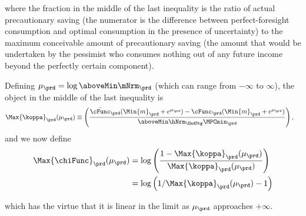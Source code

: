 \documentclass[titlepage, headings=optiontotocandhead]{econark}
\begin{document}
  \noindent  where the fraction in the middle of the last inequality is the ratio
  of actual precautionary saving (the numerator is the difference
  between perfect-foresight consumption and optimal consumption in the
  presence of uncertainty) to the maximum conceivable amount of
  precautionary saving (the amount that would be undertaken by the
  pessimist who consumes nothing out of any future income beyond the perfectly certain component).



  Defining $\mu_{\prd} =
  \log \aboveMin \mNrm_{\prd}$ (which can range from $-\infty$ to $\infty$), the object in the middle of the last inequality is
  \begin{equation}\begin{gathered}\begin{aligned}
        \Max{\koppa}_{\prd}(\mu_{\prd})   & \equiv  \left(\frac{\bar{\cFunc}_{\prd}(\Min{m}_{\prd}+e^{\mu_{\prd}})-\cFunc_{\prd}(\Min{m}_{\prd}+e^{\mu_{\prd}})}{\aboveMin \hNrm_{\EndStg} \MPCmin_{\prd}}\right), \label{eq:koppa}
      \end{aligned}\end{gathered}\end{equation}
  and we now define
  \begin{equation}\begin{gathered}\begin{aligned}
        \Max{\chiFunc}_{\prd}(\mu_{\prd})  & = \log \left(\frac{1-\Max{\koppa}_{\prd}(\mu_{\prd})}{\Max{\koppa}_{\prd}(\mu_{\prd})}\right)
        \\  & = \log \left(1/\Max{\koppa}_{\prd}(\mu_{\prd})-1\right) \label{eq:chi}
      \end{aligned}\end{gathered}\end{equation}



  which has the virtue that it is linear in the limit as $\mu_{\prd}$ approaches $+\infty$.
\end{document}
